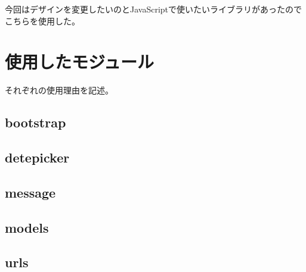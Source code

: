 今回はデザインを変更したいのとJavaScriptで使いたいライブラリがあったのでこちらを使用した。
\newpage
\section{使用したモジュール}
それぞれの使用理由を記述。
\subsection{bootstrap}

\subsection{detepicker}

\subsection{message}

\subsection{models}

\subsection{urls}